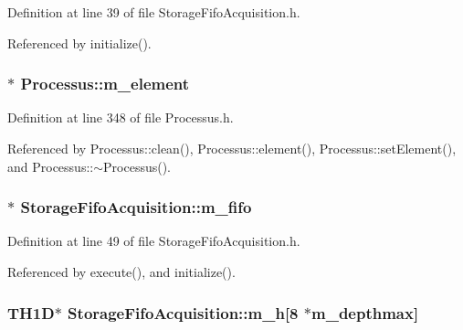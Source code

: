 Definition at line 39 of file StorageFifoAcquisition.h.

Referenced by initialize().\hypertarget{classProcessus_aa9d24d53c3e52f36786cabb5d8e296e7}{
\subsubsection[{m\_\-element}]{$\ast$ {\bf Processus::m\_\-element}}}
\label{classProcessus_aa9d24d53c3e52f36786cabb5d8e296e7}


Definition at line 348 of file Processus.h.

Referenced by Processus::clean(), Processus::element(), Processus::setElement(), and Processus::$\sim$Processus().\hypertarget{classStorageFifoAcquisition_a5405a161dc3983274ccdfdf83687d98d}{
\subsubsection[{m\_\-fifo}]{$\ast$ {\bf StorageFifoAcquisition::m\_\-fifo}}}
\label{classStorageFifoAcquisition_a5405a161dc3983274ccdfdf83687d98d}


Definition at line 49 of file StorageFifoAcquisition.h.

Referenced by execute(), and initialize().\hypertarget{classStorageFifoAcquisition_a19913cfc87da82b107e49399e3e9b754}{
\subsubsection[{m\_\-h}]{\setlength{\rightskip}{0pt plus 5cm}TH1D$\ast$ {\bf StorageFifoAcquisition::m\_\-h}\mbox{[}8 $\ast${\bf m\_\-depthmax}\mbox{]}}}
\label{classStorageFifoAcquisition_a19913cfc87da82b107e49399e3e9b754}


